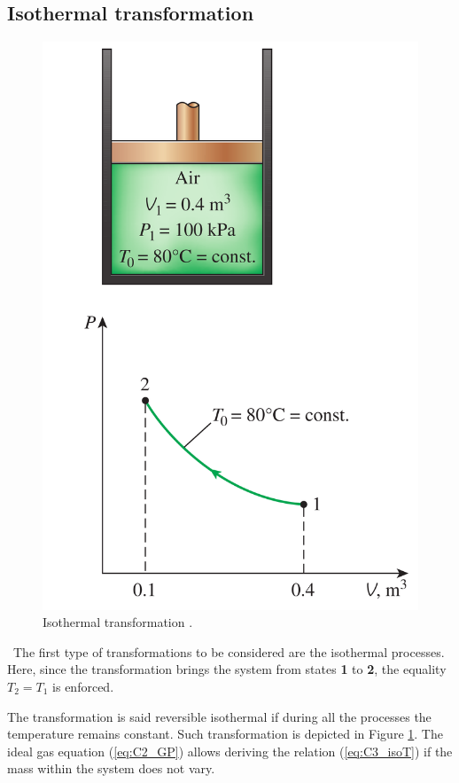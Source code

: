 \subsection{Isothermal transformation}
\begin{figure}
  \centering
  \includegraphics{isoT.png}
  \caption{Isothermal transformation \cite{2015}.}
  \label{fig:C3_isoT}
  \end{figure}
\quad\ The first type of transformations to be considered are the isothermal processes. Here, since the transformation brings the system from states \textbf{1} to \textbf{2}, the equality \(T_2 = T_1\)  is enforced. 

The transformation is said reversible isothermal if during all the processes the temperature remains constant. Such transformation is depicted in Figure \ref{fig:C3_isoT}. The ideal gas equation (\ref{eq:C2_GP}) allows deriving the relation (\ref{eq:C3_isoT}) if the mass within the system does not vary.


